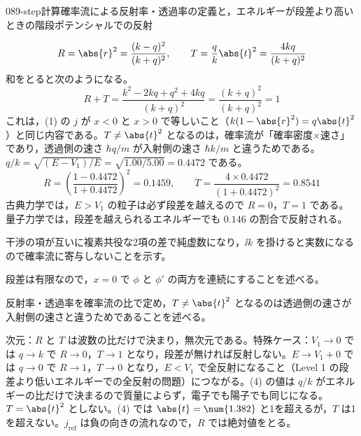 \documentclass[uplatex,dvipdfmx,a4paper,11pt]{jsarticle}
\begin{document}
\begin{mondai}{089-step}{計算}{確率流による反射率・透過率の定義と，エネルギーが段差より高いときの階段ポテンシャルでの反射}
\begin{tadashii}
\[ R=\abs{r}^{2}=\frac{(k-q)^{2}}{(k+q)^{2}},\qquad T=\frac{q}{k}\abs{t}^{2}=\frac{4kq}{(k+q)^{2}} \]
和をとると次のようになる。
\[ R+T=\frac{k^{2}-2kq+q^{2}+4kq}{(k+q)^{2}}=\frac{(k+q)^{2}}{(k+q)^{2}}=1 \]
これは，(1) の $j$ が $x<0$ と $x>0$ で等しいこと（$k(1-\abs{r}^{2})=q\abs{t}^{2}$）と同じ内容である。$T\ne\abs{t}^{2}$ となるのは，確率流が「確率密度×速さ」であり，透過側の速さ $\hbar q/m$ が入射側の速さ $\hbar k/m$ と違うためである。
 $q/k=\sqrt{(E-V_{1})/E}=\sqrt{1.00/5.00}=\num{0.4472}$ である。
\[ R=\left(\frac{1-\num{0.4472}}{1+\num{0.4472}}\right)^{2}=\num{0.1459},\qquad T=\frac{4\times\num{0.4472}}{(1+\num{0.4472})^{2}}=\num{0.8541} \]
古典力学では，$E>V_{1}$ の粒子は必ず段差を越えるので $R=0$，$T=1$ である。量子力学では，段差を越えられるエネルギーでも $\num{0.146}$ の割合で反射される。
\begin{ronten}
  \item {} 干渉の項が互いに複素共役な2項の差で純虚数になり，$\ii k$ を掛けると実数になるので確率流に寄与しないことを示す。
  \item {} 段差は有限なので，$x=0$ で $\phi$ と $\phi'$ の両方を連続にすることを述べる。
  \item {} 反射率・透過率を確率流の比で定め，$T\ne\abs{t}^{2}$ となるのは透過側の速さが入射側の速さと違うためであることを述べる。
\end{ronten}
\kenzan 次元：$R$ と $T$ は波数の比だけで決まり，無次元である。特殊ケース：$V_{1}\to 0$ では $q\to k$ で $R\to 0$，$T\to 1$ となり，段差が無ければ反射しない。$E\to V_{1}+0$ では $q\to 0$ で $R\to 1$，$T\to 0$ となり，$E<V_{1}$ で全反射になること（Level 1 の段差より低いエネルギーでの全反射の問題）につながる。(4) の値は $q/k$ がエネルギーの比だけで決まるので質量によらず，電子でも陽子でも同じになる。
\tsumazuki $T=\abs{t}^{2}$ としない。(4) では $\abs{t}=\num{1.382}$ と1を超えるが，$T$ は1を超えない。$j_{\mathrm{ref}}$ は負の向きの流れなので，$R$ では絶対値をとる。
\end{tadashii}
\end{mondai}
\end{document}
